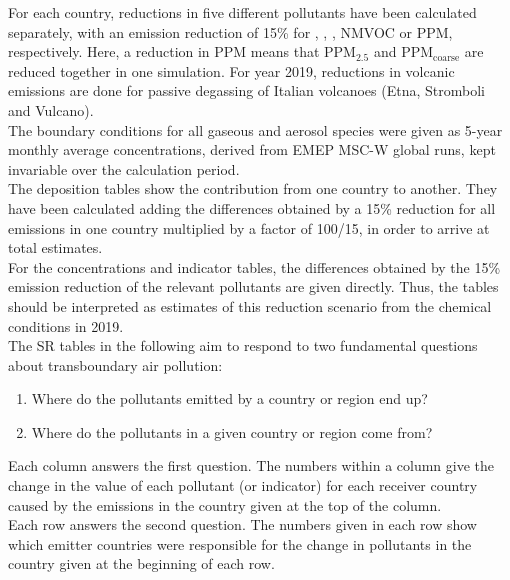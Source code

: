 For each country, reductions in five different pollutants have been
calculated separately, with an emission reduction of 15\% for \sox,
\nox, \nhiii, NMVOC or PPM, respectively. Here, a reduction in PPM
means that PPM$_{2.5}$ and PPM$_\text{coarse}$ are reduced together in one
simulation. 
For year 2019, reductions in volcanic emissions are done 
for passive \soii degassing of Italian volcanoes (Etna, Stromboli and
Vulcano). \\

The boundary conditions for all gaseous and aerosol species were given as 5-year monthly average concentrations, derived from EMEP MSC-W global runs,
kept invariable over the calculation period. \\

The deposition tables show the contribution from one
country to another. They have been calculated adding the differences
obtained by a 15\% reduction for all emissions in one country
multiplied by a factor of 100/15, in order to arrive at total
estimates.\\

For the concentrations and indicator tables, the differences obtained
by the 15\% emission reduction of the relevant pollutants are given
directly. Thus, the tables should be interpreted as estimates of
this reduction scenario from the chemical conditions in 2019.\\

The SR tables in the following aim to respond to two fundamental
questions about transboundary air pollution:

\begin{enumerate}
\item Where do the pollutants emitted by a country or region end up?
\item Where do the pollutants in a given country or region come from?
\end{enumerate}

Each column answers the first question. The numbers within a column
give the change in the value of each pollutant (or indicator) for each
receiver country caused by
the emissions in the country given at the top of the column.\\

Each row answers the second question. The numbers given in each row show
which emitter countries were responsible for the change in
pollutants in the country given at the beginning of each row.\\


